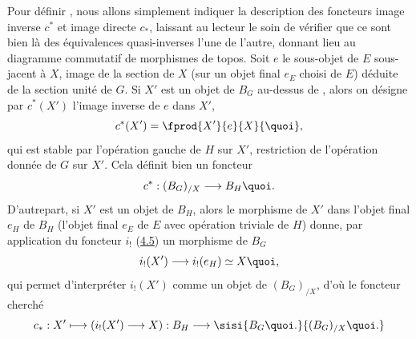 \documentclass[10pt]{../fichiers-configuration-latex/smfart}
\begin{document}
Pour définir , nous allons simplement indiquer la
description des foncteurs image inverse $c^{\ast}$ et image directe
$c_{\ast}$, laissant au lecteur le soin de vérifier que ce sont
bien là des équivalences quasi-inverses l'une de l'autre,
donnant lieu au diagramme commutatif  de morphismes de
topos. Soit $e$ le sous-objet de $E$ sous-jacent à $X$, image de
la section de $X$ (sur un objet final $e_E$ choisi de $E$) déduite
de la section unité de $G$. Si $X'$ est un objet de $B_G$
au-dessus de , alors on désigne par $c^{\ast}(X')$ l'image
inverse de $e$ dans $X'$,
$$
c^{\ast}(X')=\fprod{X'}{e}{X}{\quoi},
$$
qui est stable par l'opération gauche de $H$ sur $X'$, restriction
de l'opération donnée de $G$ sur $X'$. Cela définit bien un
foncteur
$$
c^{\ast}:(B_G)_{/X}\longrightarrow B_H{\quoi}.
$$
D'autre\pageoriginale part, si $X'$ est un objet de $B_H$, alors le
morphisme de $X'$ dans l'objet final $e_H$ de $B_H$ (\ie l'objet
final $e_E$ de $E$ avec opération triviale de $H$) donne, par
application du foncteur $i_{!}$ (\hyperref[IV.subsec4.5]{4.5}) un morphisme de
$B_G$
$$
i_{!}(X')\longrightarrow i_{!}(e_H)\simeq X{\quoi},
$$
qui permet d'interpréter $i_{!}(X')$ comme un objet de
$(B_G)_{/X}$,  d'où le foncteur cherché
$$
c_{\ast}:X'\longmapsto (i_{!}(X')\longrightarrow
X):B_H\longrightarrow \sisi{B_G{\quoi}.}{(B_G)_{/X}{\quoi}.}
$$

\setcounter{subsubsection}{2}
\end{document}
